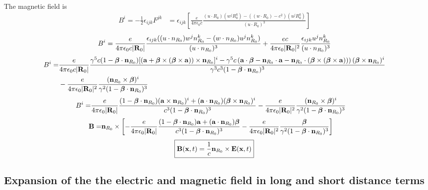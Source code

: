The magnetic field is
\begin{align}
    B^i = -\frac12\epsilon_{ijk}F^{jk} & =\epsilon_{ijk}\left[\frac{e}{4\pi\epsilon_0c}\frac{(u\cdot R_0)(w^{j}R_0^k)-((w\cdot R_0)-c^2)(u^{j}R_0^k)}{(u\cdot R_0)^3}\right]
\end{align}
\begin{align}
    B^i = \frac{e}{4\pi\epsilon_0c|{\bf R}_0|}\frac{\epsilon_{ijk}((u\cdot n_{R_0})w^{j}n_{R_0}^k-(w\cdot n_{R_0})u^j n_{R_0}^k)}{(u\cdot n_{R_0})^3}+\frac{ec}{4\pi\epsilon_0|{\bf R}_0|^2}\frac{\epsilon_{ijk}u^jn_{R_0}^k}{(u\cdot n_{R_0})^3}
\end{align}
\begin{align}
    B^i = & \frac{e}{4\pi\epsilon_0c|{\bf R}_0|}\frac{\gamma^5 c(1 -{\boldsymbol\beta}\cdot{\bf n}_{R_0})[({\bf a}+{\boldsymbol\beta}\times({\boldsymbol\beta}\times{\bf a}))\times{\bf n}_{R_0}]^i-\gamma^5 c \left({\bf a}\cdot{\boldsymbol\beta}-{\bf n}_{R_0}\cdot{\bf a}- {\bf n}_{R_0}\cdot({\boldsymbol\beta}\times({\boldsymbol\beta}\times {\bf a}))\right)({\boldsymbol\beta}\times{\bf n}_{R_0})^i}{\gamma^3 c^3(1 -{\boldsymbol\beta}\cdot{\bf n}_{R_0})^3}\nonumber \\
          & -\frac{e}{4\pi\epsilon_0|{\bf R}_0|^2}\frac{({\bf n}_{R_0}\times{\boldsymbol\beta})^i}{\gamma^2(1-{\boldsymbol\beta}\cdot{\bf n}_{R_0})^3}
\end{align}
\begin{align}
    B^i = & \frac{e}{4\pi\epsilon_0|{\bf R}_0|}\frac{(1 -{\boldsymbol\beta}\cdot{\bf n}_{R_0})({\bf a}\times{\bf n}_{R_0})^i+({\bf a}\cdot{\bf n}_{R_0})({\boldsymbol\beta}\times{\bf n}_{R_0})^i}{c^3(1 -{\boldsymbol\beta}\cdot{\bf n}_{R_0})^3}-\frac{e}{4\pi\epsilon_0|{\bf R}_0|^2}\frac{({\bf n}_{R_0}\times{\boldsymbol\beta})^i}{\gamma^2(1-{\boldsymbol\beta}\cdot{\bf n}_{R_0})^3}
\end{align}
\begin{align}
    {\bf B} = & {\bf n}_{R_0}\times\left[-\frac{e}{4\pi\epsilon_0|{\bf R}_0|}\frac{(1 -{\boldsymbol\beta}\cdot{\bf n}_{R_0}){\bf a}+({\bf a}\cdot{\bf n}_{R_0}){\boldsymbol\beta}}{c^3(1 -{\boldsymbol\beta}\cdot{\bf n}_{R_0})^3}-\frac{e}{4\pi\epsilon_0|{\bf R}_0|^2}\frac{{\boldsymbol\beta}}{\gamma^2(1-{\boldsymbol\beta}\cdot{\bf n}_{R_0})^3}\right]
\end{align}
\begin{align}
    \boxed{{\bf B}({\bf x},t)=\frac1c{\bf n}_{R_0}\times{\bf E}({\bf x},t)}
\end{align}
\subsection{Expansion of the the electric and magnetic field in long and short distance terms}

